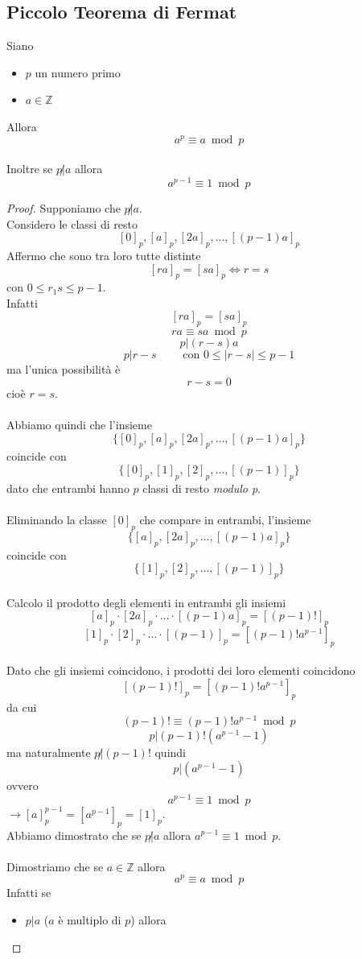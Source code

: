 \documentclass[a4paper,12pt, oneside]{book}
\begin{document}
		\subsection{Piccolo Teorema di Fermat}
			\begin{teorema}
				Siano \begin{itemize}
					\item $p$ un numero primo
					\item $a \in \mathbb{Z}$
				\end{itemize}
				Allora $$a^p \equiv a \bmod p$$\\
				Inoltre se $p \not| a$ allora $$a^{p-1} \equiv 1 \bmod p$$
				
				\begin{proof}
					Supponiamo che $p \not | a$.\\
					Considero le classi di resto
					$$[0]_p, [a]_p, [2a]_p, \dots, [(p-1)a]_p$$
					Affermo che sono tra loro tutte distinte
					$$[ra]_p=[sa]_p \iff r=s$$ con $0 \leq r_1s \leq p-1$.\\
					Infatti
					$$[ra]_p=[sa]_p$$
					$$ra \equiv sa \bmod p$$
					$$p|(r-s)a$$
					$$p|r-s \qquad \mbox{ con } 0 \leq |r-s| \leq p-1$$
					ma l'unica possibilità è $$r-s=0$$ cioè $r=s$.\\\\
					Abbiamo quindi che l'insieme
					$$\{ [0]_p, [a]_p, [2a]_p, \dots, [(p-1)a]_p \}$$ coincide con $$\{ [0]_p, [1]_p, [2]_p, \dots, [(p-1)]_p \}$$
					dato che entrambi hanno $p$ classi di resto \textit{modulo p}.\\\\
					Eliminando la classe $[0]_p$ che compare in entrambi, l'insieme 
					$$\{ [a]_p, [2a]_p, \dots, [(p-1)a]_p \}$$ coincide con $$\{ [1]_p, [2]_p, \dots, [(p-1)]_p \}$$\\
					Calcolo il prodotto degli elementi in entrambi gli insiemi
					$$ [a]_p \cdot [2a]_p \cdot \dots \cdot [(p-1)a]_p  = [(p-1)!]_p$$
					$$ [1]_p \cdot [2]_p \cdot \dots \cdot [(p-1)]_p = [(p-1)! a^{p-1}]_p$$\\
					Dato che gli insiemi coincidono, i prodotti dei loro elementi coincidono $$[(p-1)!]_p = [(p-1)! a^{p-1}]_p$$
					da cui
					$$(p-1)! \equiv (p-1)! a^{p-1} \bmod p$$
					$$p|(p-1)! (a^{p-1}-1)$$
					ma naturalmente $p \not | (p-1)!$ quindi
					$$p|(a^{p-1}-1)$$
					ovvero
					$$a^{p-1} \equiv 1 \bmod p$$
					$\longrightarrow [a]^{p-1}_p = [a^{p-1}]_p = [1]_p$.\\
					Abbiamo dimostrato che se $p \not | a$ allora $a^{p-1} \equiv 1 \bmod p$.\\\\
					Dimostriamo che se $a \in \mathbb{Z}$ allora $$a^p \equiv a \bmod p$$
					Infatti se \begin{itemize}
						\item $p|a$ ($a$ è multiplo di $p$) allora


\end{itemize}
\end{proof}
\end{teorema}
\end{document}
